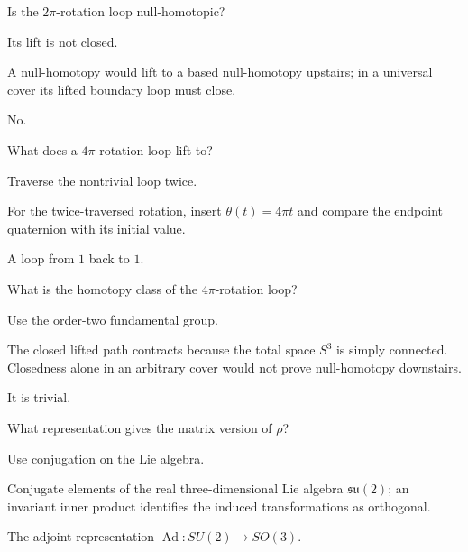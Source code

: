 \begin{exercise}\label{exr:viii13-18}
Is the \(2\pi\)-rotation loop null-homotopic?
\end{exercise}
\begin{hint}
Its lift is not closed.

A null-homotopy would lift to a based null-homotopy upstairs; in a universal cover its lifted boundary loop must close.
\end{hint}
\begin{solution}
No.
\end{solution}

\begin{exercise}\label{exr:viii13-19}
What does a \(4\pi\)-rotation loop lift to?
\end{exercise}
\begin{hint}
Traverse the nontrivial loop twice.

For the twice-traversed rotation, insert \(\theta(t)=4\pi t\) and compare the endpoint quaternion with its initial value.
\end{hint}
\begin{solution}
A loop from \(1\) back to \(1\).
\end{solution}

\begin{exercise}\label{exr:viii13-20}
What is the homotopy class of the \(4\pi\)-rotation loop?
\end{exercise}
\begin{hint}
Use the order-two fundamental group.

The closed lifted path contracts because the total space \(S^3\) is simply connected. Closedness alone in an arbitrary cover would not prove null-homotopy downstairs.
\end{hint}
\begin{solution}
It is trivial.
\end{solution}

\begin{exercise}\label{exr:viii13-21}
What representation gives the matrix version of \(\rho\)?
\end{exercise}
\begin{hint}
Use conjugation on the Lie algebra.

Conjugate elements of the real three-dimensional Lie algebra \(\mathfrak{su}(2)\); an invariant inner product identifies the induced transformations as orthogonal.
\end{hint}
\begin{solution}
The adjoint representation \(\operatorname{Ad}:SU(2)\to SO(3)\).
\end{solution}

